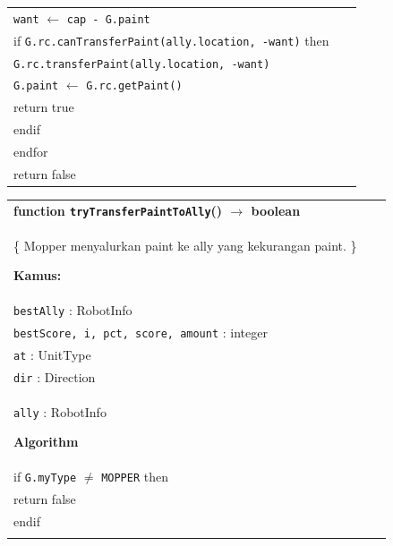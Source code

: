 \documentclass{article}
\newenvironment{pseudobox}
{
\centering
\begin{longtable}{|p{0.94\linewidth}|}
\hline
}
{
\\ \hline
\end{longtable}
\vspace{0.05cm}
}
\begin{document}
\begin{enumerate}[label=\alph*.]
\begin{enumerate}[label=\alph*.]
\begin{pseudobox}
\hspace*{3em}\texttt{want} $\leftarrow$ \texttt{cap - G.paint} \\

\hspace*{3em}if \texttt{G.rc.canTransferPaint(ally.location, -want)} then \\
\hspace*{4.5em}\texttt{G.rc.transferPaint(ally.location, -want)} \\
\hspace*{4.5em}\texttt{G.paint} $\leftarrow$ \texttt{G.rc.getPaint()} \\
\hspace*{4.5em}return true \\
\hspace*{3em}endif \\
\hspace*{1.5em}endfor \\

\hspace*{1.5em}return false
\end{pseudobox}

\begin{pseudobox}
\textbf{function \texttt{tryTransferPaintToAlly}() $\rightarrow$ boolean} \\
\{ Mopper menyalurkan paint ke ally yang kekurangan paint. \}

\textbf{Kamus:} \\
\hspace*{1.5em}\texttt{bestAlly} : RobotInfo \\
\hspace*{1.5em}\texttt{bestScore, i, pct, score, amount} : integer \\
\hspace*{1.5em}\texttt{at} : UnitType \\
\hspace*{1.5em}\texttt{dir} : Direction \\
\hspace*{1.5em}\texttt{ally} : RobotInfo

\textbf{Algorithm} \\
\hspace*{1.5em}if \texttt{G.myType} $\neq$ \texttt{MOPPER} then \\
\hspace*{3em}return false \\
\hspace*{1.5em}endif \\


\end{pseudobox}
\end{enumerate}
\end{enumerate}
\end{document}

